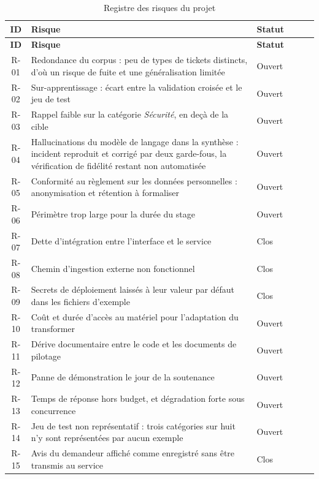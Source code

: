 \begin{center}
\styletableau
\begin{longtable}{|Cp{1.2cm}|Lp{10.6cm}|Cp{2.0cm}|}
\caption{Registre des risques du projet}\label{tab:registre}\\
\hline
{}
\textbf{ID} & \textbf{Risque} & \textbf{Statut} \\
\hline
\endfirsthead
\hline
{}
\textbf{ID} & \textbf{Risque} & \textbf{Statut} \\
\hline
\endhead
R-01 & Redondance du corpus : peu de types de tickets distincts, d'où un risque de fuite et une
généralisation limitée & Ouvert \\
\hline
R-02 & Sur-apprentissage : écart entre la validation croisée et le jeu de test & Ouvert \\
\hline
R-03 & Rappel faible sur la catégorie \emph{Sécurité}, en deçà de la cible & Ouvert \\
\hline
R-04 & Hallucinations du modèle de langage dans la synthèse : incident reproduit et corrigé par
deux garde-fous, la vérification de fidélité restant non automatisée & Ouvert \\
\hline
R-05 & Conformité au règlement sur les données personnelles : anonymisation et rétention à
formaliser & Ouvert \\
\hline
R-06 & Périmètre trop large pour la durée du stage & Ouvert \\
\hline
R-07 & Dette d'intégration entre l'interface et le service & Clos \\
\hline
R-08 & Chemin d'ingestion externe non fonctionnel & Clos \\
\hline
R-09 & Secrets de déploiement laissés à leur valeur par défaut dans les fichiers d'exemple &
Clos \\
\hline
R-10 & Coût et durée d'accès au matériel pour l'adaptation du transformer & Ouvert \\
\hline
R-11 & Dérive documentaire entre le code et les documents de pilotage & Ouvert \\
\hline
R-12 & Panne de démonstration le jour de la soutenance & Ouvert \\
\hline
R-13 & Temps de réponse hors budget, et dégradation forte sous concurrence & Ouvert \\
\hline
R-14 & Jeu de test non représentatif : trois catégories sur huit n'y sont représentées par aucun
exemple & Ouvert \\
\hline
R-15 & Avis du demandeur affiché comme enregistré sans être transmis au service & Clos \\

\end{longtable}
\end{center}
